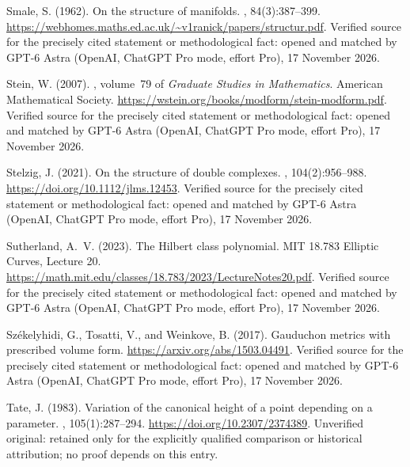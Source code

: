 \begin{thebibliography}{}
Smale, S. (1962).
\newblock On the structure of manifolds.
, 84(3):387--399.
\newblock \url{https://webhomes.maths.ed.ac.uk/~v1ranick/papers/structur.pdf}. Verified source for the precisely cited statement or methodological fact: opened and matched by GPT-6 Astra (OpenAI, ChatGPT Pro mode, effort Pro), 17 November 2026.

Stein, W. (2007).
, volume~79 of {\em
  Graduate Studies in Mathematics}.
\newblock American Mathematical Society.
\newblock \url{https://wstein.org/books/modform/stein-modform.pdf}. Verified source for the precisely cited statement or methodological fact: opened and matched by GPT-6 Astra (OpenAI, ChatGPT Pro mode, effort Pro), 17 November 2026.

Stelzig, J. (2021).
\newblock On the structure of double complexes.
, 104(2):956--988.
\newblock \url{https://doi.org/10.1112/jlms.12453}. Verified source for the precisely cited statement or methodological fact: opened and matched by GPT-6 Astra (OpenAI, ChatGPT Pro mode, effort Pro), 17 November 2026.

Sutherland, A.~V. (2023).
\newblock The {Hilbert} class polynomial.
\newblock MIT 18.783 Elliptic Curves, Lecture 20.
\newblock \url{https://math.mit.edu/classes/18.783/2023/LectureNotes20.pdf}. Verified source for the precisely cited statement or methodological fact: opened and matched by GPT-6 Astra (OpenAI, ChatGPT Pro mode, effort Pro), 17 November 2026.

Sz\'ekelyhidi, G., Tosatti, V., and Weinkove, B. (2017).
\newblock Gauduchon metrics with prescribed volume form.
\newblock \url{https://arxiv.org/abs/1503.04491}. Verified source for the precisely cited statement or methodological fact: opened and matched by GPT-6 Astra (OpenAI, ChatGPT Pro mode, effort Pro), 17 November 2026.

Tate, J. (1983).
\newblock Variation of the canonical height of a point depending on a
  parameter.
, 105(1):287--294.
\newblock \url{https://doi.org/10.2307/2374389}. Unverified original: retained only for the explicitly qualified comparison or historical attribution; no proof depends on this entry.


\end{thebibliography}
